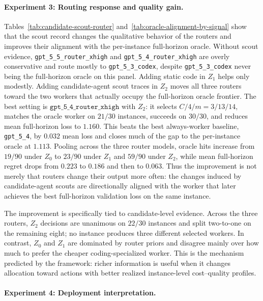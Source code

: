 \documentclass{article}
\begin{document}
\paragraph{Experiment 3: Routing response and quality gain.}
Tables~\ref{tab:candidate-scout-router} and~\ref{tab:oracle-alignment-by-signal} show that the scout record changes the qualitative behavior of the routers and improves their alignment with the per-instance full-horizon oracle.
Without scout evidence, \texttt{gpt\_5\_5\_router\_xhigh} and \texttt{gpt\_5\_4\_router\_xhigh} are overly conservative and route mostly to \texttt{gpt\_5\_3\_codex}, despite \texttt{gpt\_5\_3\_codex} never being the full-horizon oracle on this panel.
Adding static code in \(Z_1\) helps only modestly.
Adding candidate-agent scout traces in \(Z_2\) moves all three routers toward the two workers that actually occupy the full-horizon oracle frontier.
The best setting is \(\texttt{gpt\_5\_4\_router\_xhigh}\) with \(Z_2\): it selects \(C/4/m=3/13/14\), matches the oracle worker on \(21/30\) instances, succeeds on \(30/30\), and reduces mean full-horizon loss to \(1.160\).
This beats the best always-worker baseline, \texttt{gpt\_5\_4}, by \(0.032\) mean loss and closes much of the gap to the per-instance oracle at \(1.113\).
Pooling across the three router models, oracle hits increase from \(19/90\) under \(Z_0\) to \(23/90\) under \(Z_1\) and \(59/90\) under \(Z_2\), while mean full-horizon regret drops from \(0.223\) to \(0.186\) and then to \(0.063\).
Thus the improvement is not merely that routers change their output more often: the changes induced by candidate-agent scouts are directionally aligned with the worker that later achieves the best full-horizon validation loss on the same instance.

The improvement is specifically tied to candidate-level evidence.
Across the three routers, \(Z_2\) decisions are unanimous on \(22/30\) instances and split two-to-one on the remaining eight; no instance produces three different selected workers.
In contrast, \(Z_0\) and \(Z_1\) are dominated by router priors and disagree mainly over how much to prefer the cheaper coding-specialized worker.
This is the mechanism predicted by the framework: richer information is useful when it changes allocation toward actions with better realized instance-level cost--quality profiles.

\paragraph{Experiment 4: Deployment interpretation.}
\end{document}
